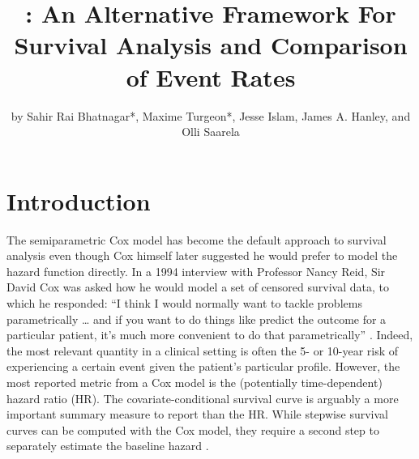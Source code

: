 \title{: An Alternative Framework For Survival Analysis
and Comparison of Event Rates}
\author{by Sahir Rai Bhatnagar*, Maxime Turgeon*, Jesse Islam, James A.
Hanley, and Olli Saarela}

\maketitle


\hypertarget{introduction}{%
\section{Introduction}\label{introduction}}

The semiparametric Cox model has become the default approach to survival
analysis even though Cox himself later suggested he would prefer to
model the hazard function directly. In a 1994 interview with Professor
Nancy Reid, Sir David Cox was asked how he would model a set of censored
survival data, to which he responded: ``I think I would normally want to
tackle problems parametrically \ldots{} and if you want to do things
like predict the outcome for a particular patient, it's much more
convenient to do that parametrically'' \citep{reid1994conversation}.
Indeed, the most relevant quantity in a clinical setting is often the 5-
or 10-year risk of experiencing a certain event given the patient's
particular profile. However, the most reported metric from a Cox model
is the (potentially time-dependent) hazard ratio (HR). The
covariate-conditional survival curve is arguably a more important
summary measure to report than the HR. While stepwise survival curves
can be computed with the Cox model, they require a second step to
separately estimate the baseline hazard \citep{breslow1972discussion}.

